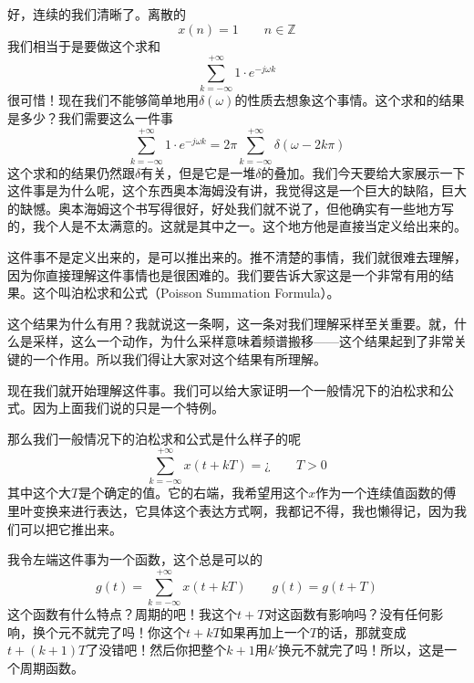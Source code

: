 \documentclass[a4paper,12pt]{article}
\begin{document}
好，连续的我们清晰了。离散的
\begin{equation}
    x(n) = 1 \quad\quad n\in \mathbb{Z}
\end{equation}
我们相当于是要做这个求和
\begin{equation}
    \sum_{k=-\infty}^{+\infty}1\cdot e^{-j\omega k}
\end{equation}
很可惜！现在我们不能够简单地用$\delta(\omega)$的性质去想象这个事情。这个求和的结果是多少？我们需要这么一件事
\begin{equation}
    \sum_{k=-\infty}^{+\infty}1\cdot e^{-j\omega k}=2\pi \sum_{k=-\infty}^{+\infty}\delta\left( \omega-2k \pi \right)
\end{equation}
这个求和的结果仍然跟$\delta$有关，但是它是一堆$\delta$的叠加。我们今天要给大家展示一下这件事是为什么呢，这个东西奥本海姆没有讲，我觉得这是一个巨大的缺陷，巨大的缺憾。奥本海姆这个书写得很好，好处我们就不说了，但他确实有一些地方写的，我个人是不太满意的。这就是其中之一。这个地方他是直接当定义给出来的。

这件事不是定义出来的，是可以推出来的。推不清楚的事情，我们就很难去理解，因为你直接理解这件事情也是很困难的。我们要告诉大家这是一个非常有用的结果。这个叫泊松求和公式（Poisson Summation Formula）。

这个结果为什么有用？我就说这一条啊，这一条对我们理解采样至关重要。就，什么是采样，这么一个动作，为什么采样意味着频谱搬移——这个结果起到了非常关键的一个作用。所以我们得让大家对这个结果有所理解。

现在我们就开始理解这件事。我们可以给大家证明一个一般情况下的泊松求和公式。因为上面我们说的只是一个特例。

那么我们一般情况下的泊松求和公式是什么样子的呢
\begin{equation}
    \sum_{k=-\infty}^{+\infty}x(t+kT) = ¿\quad\quad T>0
\end{equation}
其中这个大$T$是个确定的值。它的右端，我希望用这个$x$作为一个连续值函数的傅里叶变换来进行表达，它具体这个表达方式啊，我都记不得，我也懒得记，因为我们可以把它推出来。

我令左端这件事为一个函数，这个总是可以的
\begin{equation}
    g(t )= \sum_{k=-\infty}^{+\infty}x(t+kT) \quad\quad g(t) = g(t+T)
\end{equation}
这个函数有什么特点？周期的吧！我这个$t+T$对这函数有影响吗？没有任何影响，换个元不就完了吗！你这个$t+kT$如果再加上一个$T$的话，那就变成$t+(k+1)T$了没错吧！然后你把整个$k+1$用$k'$换元不就完了吗！所以，这是一个周期函数。
\end{document}
